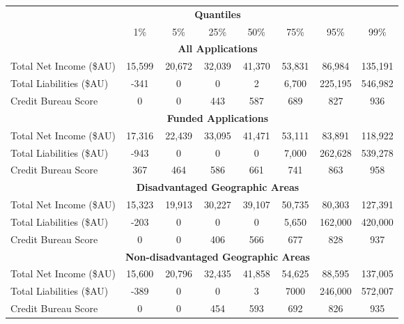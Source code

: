\begin{tabular}{ l | c c c c c c c }
    & \multicolumn{5}{c}{\textbf{Quantiles}} \\
    & 1\% & 5\% & 25\% & 50\% & 75\% & 95\% & 99\% \\
    \hline 
    & \multicolumn{5}{c}{\textbf{All Applications}} \\
    Total Net Income (\$AU)  & 15,599 & 20,672 & 32,039 & 41,370 & 53,831 & 86,984 & 135,191 \\
    Total Liabilities (\$AU)  & -341 & 0 & 0 & 2 & 6,700 & 225,195 & 546,982 \\
    Credit Bureau Score & 0	& 0 & 443 & 587 & 689 & 827 & 936 \\
    & \multicolumn{5}{c}{\textbf{Funded Applications}} \\
    Total Net Income (\$AU)  & 17,316 & 22,439 & 33,095 & 41,471 & 53,111 & 83,891 & 118,922 \\
    Total Liabilities (\$AU)  & -943 & 0 & 0 & 0 & 7,000 & 262,628 & 539,278 \\
    Credit Bureau Score & 367 & 464 & 586 & 661 & 741 & 863	& 958 \\
    & \multicolumn{5}{c}{\textbf{Disadvantaged Geographic Areas}} \\
    Total Net Income (\$AU) & 15,323 & 19,913 & 30,227 & 39,107 & 50,735 & 80,303 & 127,391 \\
    Total Liabilities (\$AU) & -203 & 0 & 0 & 0 & 5,650 & 162,000 & 420,000 \\
    Credit Bureau Score & 0 & 0 & 406 & 566 & 677 & 828 & 937 \\
    & \multicolumn{5}{c}{\textbf{Non-disadvantaged Geographic Areas}} \\
    Total Net Income (\$AU)  & 15,600 & 20,796 & 32,435 & 41,858 & 54,625 & 88,595 & 137,005 \\
    Total Liabilities (\$AU) & -389 & 0 & 0 & 3 & 7000 & 246,000 & 572,007 \\
    Credit Bureau Score & 0 & 0 & 454 & 593 & 692 & 826 & 935 
\end{tabular}
